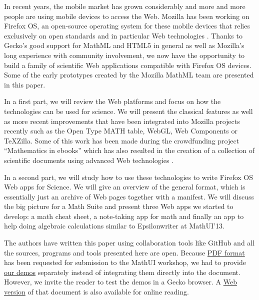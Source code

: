 In recent years, the mobile market has grown considerably and more and more
people are using mobile devices to access the Web. Mozilla has been working
on Firefox OS, an open-source operating system for these mobile devices that
relies exclusively on open standards and in particular Web technologies
\cite{MozillaFirefoxOS}. Thanks to
Gecko's good support for MathML and HTML5 in general as well as
Mozilla's long experience with community involvement, we now have the opportunity
to build a family of scientific Web applications compatible with Firefox OS devices.
Some of the early prototypes created by the Mozilla MathML team are presented
in this paper.

In a first part, we will review the Web platforms and focus on how the
technologies
can be used for science. We will present the classical features
as well as more recent improvements that have been integrated into Mozilla
projects recently such as the Open Type MATH table, WebGL, Web Components or
TeXZilla. Some of this work has been made during the crowdfunding project
``Mathematics in ebooks'' which has also resulted in the creation of a collection
of scientific documents using advanced Web technologies \cite{MathInEbooks}.

In a second
part, we will study how to use these technologies to write Firefox OS Web apps
for Science. We will give an overview of the general format, which is
essentially just an archive of Web pages together with a manifest. We will
discuss the big picture for a Math Suite and present three Web apps we started
to develop: a math cheat sheet, a note-taking app for math and finally an app
to help doing algebraic calculations similar to Epsilonwriter at MathUI'13.

The authors have written this paper using collaboration tools like GitHub and
all the sources, programs and tools presented here are open. Because 
\href{http://fred-wang.github.io/MathUI2014/paper/output/MathUI2014-MozillaMathML.pdf}{PDF format}
has been requested for submission to the MathUI workshop, we had to provide
\href{http://fred-wang.github.io/MathUI2014/demos/}{our demos} separately instead of integrating them directly into the document.
However, we invite the reader to test the demos in a Gecko browser. A 
\href{http://fred-wang.github.io/MathUI2014/paper/output/}{Web version} of that document is also available for online reading.
